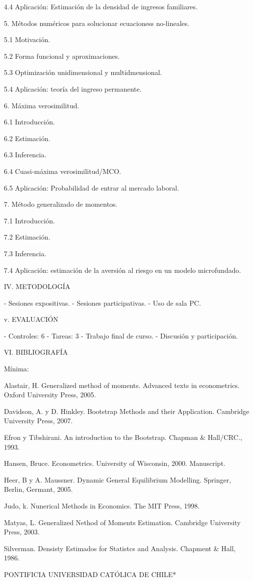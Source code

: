 4.4 Aplicación: Estimación de la densidad de ingresos familiares.


5. Métodos numéricos para solucionar ecuacioness no-lineales.

5.1 Motivación.

5.2 Forma funcional y aproximaciones.

5.3 Optimización unidimensional y multidmensional.

5.4 Aplicación: teoría del ingreso permanente.


6. Máxima verosimilitud.

6.1 Introducción.

6.2 Estimación.

6.3 Inferencia.

6.4 Cuasi-máxima verosimilitud/MCO.

6.5 Aplicación: Probabilidad de entrar al mercado laboral.


7. Método generalizado de momentos.

7.1 Introducción.

7.2 Estimación.

7.3 Inferencia.

7.4 Aplicación: estimación de la aversión al riesgo en un modelo microfundado.


IV. METODOLOGÍA

- Sesiones expositivas.
- Sesiones participativas.
- Uso de sala PC.


v. EVALUACIÓN

- Controles: 6
- Tareas: 3
- Trabajo final de curso.
- Discusión y participación.


VI. BIBLIOGRAFÍA

Mínima:

Alastair, H. Generalized method of moments. Advanced texts in econometrics. Oxford University Press, 2005.

Davidson, A. y D. Hinkley. Bootstrap Methods and their Application. Cambridge University Press, 2007.

Efron y Tibshirani. An introduction to the Bootstrap. Chapman & Hall/CRC., 1993.

Hansen, Bruce. Econometrics. University of Wisconsin, 2000. Manuscript.

Heer, B y A. Maussner. Dynamic General Equilibrium Modelling. Springer, Berlin, Germant, 2005.

Judo, k. Nunerical Methods in Economics. The MIT Press, 1998.

Matyas, L. Generalized Nethod of Moments Estimation. Cambridge University Press, 2003.

Silverman. Densisty Estimados for Statistcs and Analysis. Chapment & Hall, 1986.



PONTIFICIA UNIVERSIDAD CATÓLICA DE CHILE*
